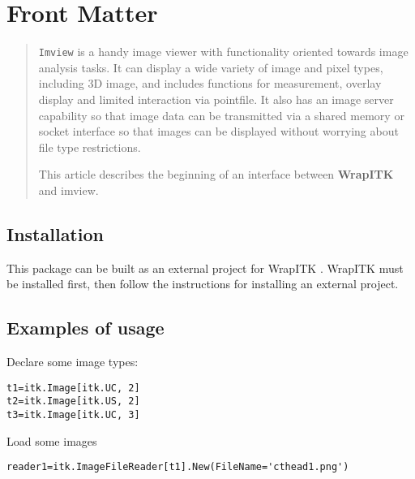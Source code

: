 \documentclass{InsightArticle}
\title{}
\author{Richard Beare}
\begin{document}
\maketitle

\ifhtml
\chapter*{Front Matter\label{front}}
\fi


\begin{abstract}
\noindent
{\tt Imview}\cite{imview} is a handy image viewer with functionality oriented
towards image analysis tasks. It can display a wide variety of image
and pixel types, including 3D image, and includes functions for
measurement, overlay display and limited interaction via pointfile. It
also has an image server capability so that image data can be
transmitted via a shared memory or socket interface so that images can
be displayed without worrying about file type restrictions.

This article describes the beginning of an interface between {\bf
WrapITK} and imview.
\end{abstract}

\tableofcontents

\section{Installation}
This package can be built as an external project for WrapITK
\cite{WrapITK}. WrapITK must be installed first, then follow 
the instructions for installing an external project.

\section{Examples of usage}
Declare some image types:
\begin{verbatim}
t1=itk.Image[itk.UC, 2]
t2=itk.Image[itk.US, 2]
t3=itk.Image[itk.UC, 3]
\end{verbatim}

Load some images
\begin{verbatim}
reader1=itk.ImageFileReader[t1].New(FileName='cthead1.png')
\end{verbatim}

\appendix





\nocite{ITKSoftwareGuide}
\end{document}
